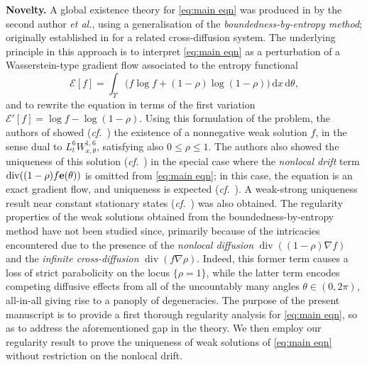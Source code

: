 \documentclass[11pt,a4paper,reqno]{amsart}
\theoremstyle{remark}
\theoremstyle{definition}
\numberwithin{equation}{section}
\DeclareMathOperator{\dv}{div}
\newcommand{\e}{{\bf e}}
\renewcommand{\d}{\, \mathrm{d} }
\begin{document}
\noindent\textbf{Novelty.} A global existence theory for \eqref{eq:main eqn} was produced in \cite{Martin} by the second author \emph{et al.}, using a generalisation of the \emph{boundedness-by-entropy method}; originally established in \cite{BoundEntropy} for a related cross-diffusion system. The underlying principle in this approach is to interpret \eqref{eq:main eqn} as a perturbation of a Wasserstein-type gradient flow  associated to the entropy functional 
\begin{equation*}
    \mathcal{E}[f] = \int_\Upsilon \Big( f \log f + (1-\rho) \log (1-\rho)  \Big) \d x \d \theta, 
\end{equation*}
and to rewrite the equation in terms of the first variation $\mathcal{E}'[f] = \log f - \log(1-\rho).$ Using this formulation of the problem, the authors of \cite{Martin} showed (\textit{cf.}~\cite[Theorem 1]{Martin}) the existence of a nonnegative weak solution $f$, in the sense dual to $L^6_t W^{1,6}_{x,\theta}$, satisfying also $0 \leq \rho \leq 1$. The authors also showed the uniqueness of this solution (\textit{cf.}~\cite[Theorem 2]{Martin}) in the special case where the \emph{nonlocal drift} term $\dv((1-\rho)f \e(\theta))$ is omitted from \eqref{eq:main eqn}; in this case, the equation is an exact gradient flow, and uniqueness is expected (\textit{cf.}~\cite{AGS,Filippo}). A weak-strong uniqueness result near constant stationary states (\textit{cf.}~\cite[Theorem 4]{Martin}) was also obtained. The regularity properties of the weak solutions obtained from the boundedness-by-entropy method have not been studied since, primarily because of the intricacies encountered due to the presence of the \emph{nonlocal diffusion} $\dv((1-\rho)\nabla f)$ and the \emph{infinite cross-diffusion} $\dv(f\nabla \rho)$. Indeed, this former term causes a loss of strict parabolicity on the locus $\{\rho=1\}$, while the latter term encodes competing diffusive effects from all of the uncountably many angles $\theta \in (0,2\pi)$, all-in-all giving rise to a panoply of degeneracies. The purpose of the present manuscript is to provide a first thorough regularity analysis for \eqref{eq:main eqn}, so as to address the aforementioned gap in the theory. We then employ our regularity result to prove the uniqueness of weak solutions of \eqref{eq:main eqn} without restriction on the nonlocal drift. 
\end{document}
